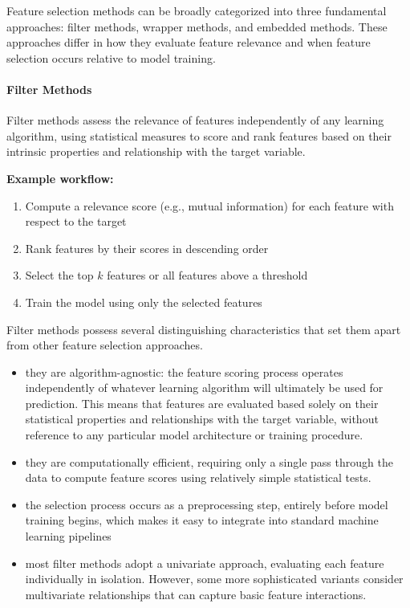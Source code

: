 Feature selection methods can be broadly categorized into three fundamental approaches: \alert{filter methods}, \alert{wrapper methods}, and \alert{embedded methods}. These approaches differ in how they evaluate feature relevance and when feature selection occurs relative to model training.

\paragraph{Filter Methods}

Filter methods assess the relevance of features \alert{independently of any learning algorithm}, using statistical measures to score and rank features based on their intrinsic properties and relationship with the target variable.

\textbf{Example workflow:}
\begin{enumerate}
\item Compute a relevance score (e.g., mutual information) for each feature with respect to the target
\item Rank features by their scores in descending order
\item Select the top $k$ features or all features above a threshold
\item Train the model using only the selected features
\end{enumerate}

Filter methods possess several distinguishing characteristics that set them apart from other feature selection approaches. 
\begin{itemize}
\item they are algorithm-agnostic: the feature scoring process operates independently of whatever learning algorithm will ultimately be used for prediction. This means that features are evaluated based solely on their statistical properties and relationships with the target variable, without reference to any particular model architecture or training procedure. 
\item they are computationally efficient, requiring only a single pass through the data to compute feature scores using relatively simple statistical tests. \item the selection process occurs as a preprocessing step, entirely before model training begins, which makes it easy to integrate into standard machine learning pipelines
\item most filter methods adopt a univariate approach, evaluating each feature individually in isolation. However, some more sophisticated variants consider multivariate relationships that can capture basic feature interactions.
\end{itemize}

